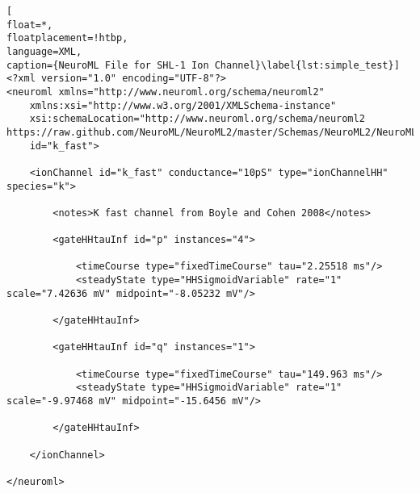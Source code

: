 \documentclass[10pt,a4paper]{article}
\begin{document}
\begin{lstlisting}[
float=*,
floatplacement=!htbp,
language=XML,
caption={NeuroML File for SHL-1 Ion Channel}\label{lst:simple_test}]
<?xml version="1.0" encoding="UTF-8"?>
<neuroml xmlns="http://www.neuroml.org/schema/neuroml2"
    xmlns:xsi="http://www.w3.org/2001/XMLSchema-instance"
    xsi:schemaLocation="http://www.neuroml.org/schema/neuroml2  https://raw.github.com/NeuroML/NeuroML2/master/Schemas/NeuroML2/NeuroML_v2beta.xsd"
    id="k_fast">

    <ionChannel id="k_fast" conductance="10pS" type="ionChannelHH" species="k">

        <notes>K fast channel from Boyle and Cohen 2008</notes>

        <gateHHtauInf id="p" instances="4">

            <timeCourse type="fixedTimeCourse" tau="2.25518 ms"/>
            <steadyState type="HHSigmoidVariable" rate="1" scale="7.42636 mV" midpoint="-8.05232 mV"/>

        </gateHHtauInf>
        
        <gateHHtauInf id="q" instances="1">

            <timeCourse type="fixedTimeCourse" tau="149.963 ms"/>
            <steadyState type="HHSigmoidVariable" rate="1" scale="-9.97468 mV" midpoint="-15.6456 mV"/>

        </gateHHtauInf>

    </ionChannel>

</neuroml>

\end{lstlisting}
\end{document}

